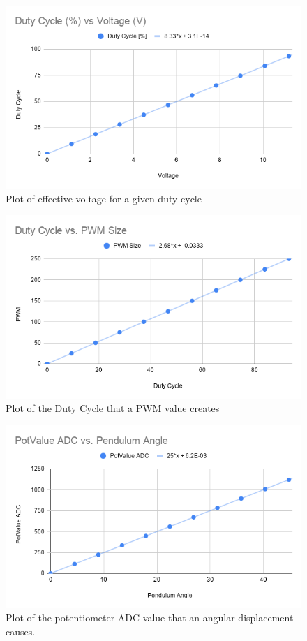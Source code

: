 \documentclass[a4paper, 11pt, compsoc]{IEEEtran}
\begin{document}
			\begin{figure}[!ht]
				\centering
				\includegraphics[width=0.8\columnwidth]{dutyCycleVoltage.png}
				\caption{Plot of effective voltage for a given duty cycle}
				\label{fig:DCV}
			\end{figure}

			\begin{figure}[!ht]
				\centering
				\includegraphics[width=0.8\columnwidth]{dutyCyclePWM.png}
				\caption{Plot of the Duty Cycle that a PWM value creates}
				\label{fig:DCPWM}
			\end{figure}

			\begin{figure}[!ht]
				\centering
				\includegraphics[width=0.8\columnwidth]{potPen.png}
				\caption{Plot of the potentiometer ADC value that an angular displacement causes.}
				\label{fig:potPen}
			\end{figure}
			
\end{document}
